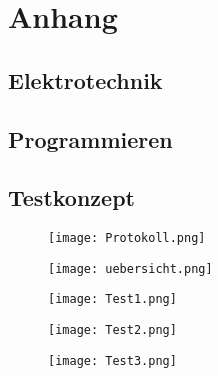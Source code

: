 \section{Anhang} \label{sec:anhang}


\subsection{Elektrotechnik} \label{subsec:eltech}








\subsection{Programmieren} \label{subsec:softech}



\subsection{Testkonzept} \label{subsec:eltech}


\begin{figure}[H]
	\centering
	\texttt{[image: Protokoll.png]}
	\label{fig:Protokoll}
\end{figure}

\begin{figure}[H]
	\centering
	\texttt{[image: uebersicht.png]}
	\label{fig:übersicht}
\end{figure}

\begin{figure}[H]
	\centering
	\texttt{[image: Test1.png]}
	\label{fig:Test1}
\end{figure}

\begin{figure}[H]
	\centering
	\texttt{[image: Test2.png]}
	\label{fig:Test2}
\end{figure}

\begin{figure}[H]
	\centering
	\texttt{[image: Test3.png]}
	\label{fig:Test3}
\end{figure}

